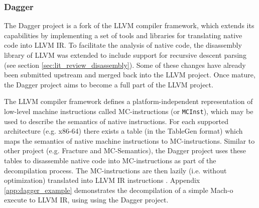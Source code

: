 
\subsubsection{Dagger}

The Dagger project is a fork of the LLVM compiler framework, which extends its capabilities by implementing a set of tools and libraries for translating native code into LLVM IR. To facilitate the analysis of native code, the disassembly library of LLVM was extended to include support for recursive descent parsing (see section \ref{sec:lit_review_disassembly}). Some of these changes have already been submitted upstream and merged back into the LLVM project. Once mature, the Dagger project aims to become a full part of the LLVM project.

The LLVM compiler framework defines a platform-independent representation of low-level machine instructions called MC-instructions (or \texttt{MCInst}), which may be used to describe the semantics of native instructions. For each supported architecture (e.g. x86-64) there exists a table (in the TableGen format) which maps the semantics of native machine instructions to MC-instructions. Similar to other project (e.g. Fracture and MC-Semantics), the Dagger project uses these tables to disassemble native code into MC-instructions as part of the decompilation process. The MC-instructions are then lazily (i.e. without optimization) translated into LLVM IR instructions \cite{dagger}. Appendix \ref{app:dagger_example} demonstrates the decompilation of a simple Mach-o execute to LLVM IR, using using the Dagger project.
